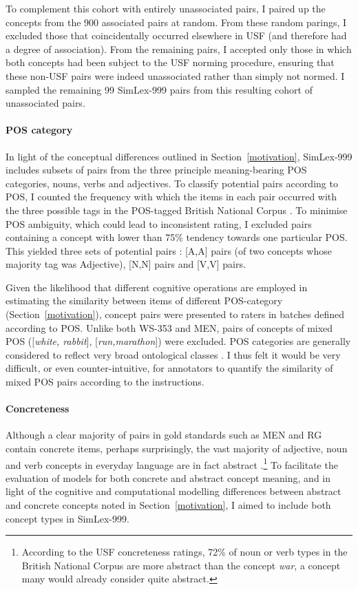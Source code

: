 
To complement this cohort with entirely unassociated pairs, I paired up the concepts from the 900 associated pairs at random. From these random parings, I excluded those that coincidentally occurred elsewhere in USF (and therefore had a degree of association). From the remaining pairs, I accepted only those in which both concepts had been subject to the USF norming procedure, ensuring that these non-USF pairs were indeed unassociated rather than simply not normed. I sampled the remaining 99 SimLex-999 pairs from this resulting cohort of unassociated pairs.  

\paragraph{POS category} In light of the conceptual differences outlined in Section~\ref{motivation}, SimLex-999 includes subsets of pairs from the three principle meaning-bearing POS categories, nouns, verbs and adjectives. To classify potential pairs according to POS, I counted the frequency with which the items in each pair occurred with the three possible tags in the  POS-tagged British National Corpus \citep{leech1994claws4}. To minimise POS ambiguity, which could lead to inconsistent rating, I excluded pairs containing a concept with lower than 75\% tendency towards one particular POS. This yielded three sets of potential pairs : [A,A] pairs (of two concepts whose majority tag was Adjective), [N,N] pairs and [V,V] pairs. 

Given the likelihood that different cognitive operations are employed in estimating the similarity between items of different POS-category (Section~\ref{motivation}), concept pairs were presented to raters in batches defined according to POS. Unlike both WS-353 and MEN, pairs of concepts of mixed POS ([\emph{white, rabbit}], [\emph{run,marathon}]) were excluded. POS categories are generally considered to reflect very broad ontological classes \citep{fellbaum1999wordnet}. I thus felt it would be very difficult, or even counter-intuitive, for annotators to quantify the similarity of mixed POS pairs according to the instructions. 

\paragraph{Concreteness} Although a clear majority of pairs in gold standards such as MEN and RG contain concrete items, perhaps surprisingly, the vast majority of adjective, noun and verb concepts in everyday language are in fact abstract \citep{hill2014multi,kielaimproving}.\footnote{According to the USF concreteness ratings, 72\% of noun or verb types in the British National Corpus are more abstract than the concept \emph{war}, a concept many would already consider quite abstract.} To facilitate the evaluation of models for both concrete and abstract concept meaning, and in light of the cognitive and computational modelling differences  between abstract and concrete concepts noted in Section~\ref{motivation}, I aimed to include both concept types in SimLex-999. 

